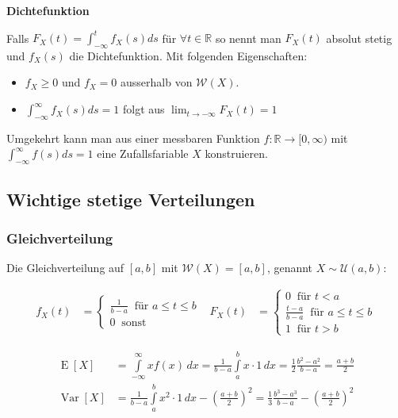 \documentclass[25pt]{sciposter}
\newcommand{\R}{\mathbb{R}}
\newcommand{\W}{\mathcal{W}}
\newcommand{\U}{\mathcal{U}}
\newcommand{\Var}{\operatorname{Var}}
\newcommand{\E}{\operatorname{E}}
\newenvironment{method}[1]{\begin{mdframed}[backgroundcolor=blue!10,innertopmargin=15pt, innerbottommargin=15pt,nobreak=true]
		\textbf{#1 }
	}
	{ 
	\end{mdframed}
}
\begin{document}
\begin{multicols}{3}
\begin{method}{Dichtefunktion}
	Falls $F_X(t) = \int_{-\infty}^t f_X(s) ds$ für $\forall t\in\R$ so nennt man $F_X(t)$ absolut stetig und $f_X(s)$ die Dichtefunktion. Mit folgenden Eigenschaften:
	\begin{itemize}
		\item $f_X \geq 0$ und $f_X = 0$ ausserhalb von $\W(X)$.
		\item $\int_{-\infty}^\infty f_X(s) ds = 1$ folgt aus $\lim_{t \to -\infty}F_X(t) = 1$
	\end{itemize}

Umgekehrt kann man aus einer messbaren Funktion $f:\R\to[0,\infty)$ mit $\int_{-\infty}^\infty f(s)ds = 1$ eine Zufallsfariable $X$ konstruieren.
\end{method}


\subsection*{Wichtige stetige Verteilungen}

\subsubsection*{Gleichverteilung}
Die Gleichverteilung auf $[a,b]$ mit $\W(X)=[a,b]$, genannt $X\sim\U(a,b)$:

\begin{align*}
	f_X(t) &= \begin{cases}
	\frac{1}{b-a} \ \text{ für } a \leq t \leq b\\
	0 \ \text{ sonst}
	\end{cases}
	& 
	F_X(t) &= \begin{cases}
	0 \ \text{ für } t<a \\
	\frac{t-a}{b-a} \ \text{ für } a \leq t \leq b\\
	1 \ \text{ für } t > b
	\end{cases}
\end{align*}


\begin{align*}
\E[X] &= {\displaystyle\int \limits _{-\infty }^{\infty }xf(x)\,dx={\frac {1}{b-a}}\int \limits _{a}^{b}x\cdot 1\,dx={\frac {1}{2}}{\frac {b^{2}-a^{2}}{b-a}}={\frac {a+b}{2}}} \\ \Var[X] &={\frac {1}{b-a}}\int \limits _{a}^{b}{x^{2}\cdot 1\,dx}-\left({\frac {a+b}{2}}\right)^{2}={\frac {1}{3}}{\frac {b^{3}-a^{3}}{b-a}}-\left({\frac {a+b}{2}}\right)^{2}
\end{align*}





\end{multicols}
\end{document}
